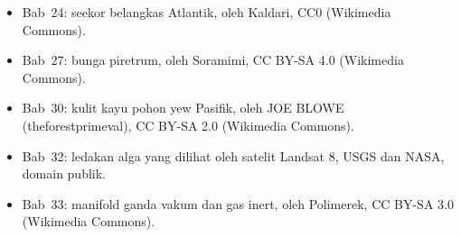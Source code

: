 \begin{itemize}
        Lycurgus, oleh Marie-Lan Nguyen, CC BY 2.5 (Wikimedia Commons).
  \item Bab~24: seekor belangkas Atlantik, oleh Kaldari, CC0 (Wikimedia
        Commons).
  \item Bab~27: bunga piretrum, oleh Soramimi, CC BY-SA 4.0 (Wikimedia
        Commons).
  \item Bab~30: kulit kayu pohon yew Pasifik, oleh JOE BLOWE (theforestprimeval),
        CC BY-SA 2.0 (Wikimedia Commons).
  \item Bab~32: ledakan alga yang dilihat oleh satelit Landsat 8, USGS dan NASA,
        domain publik.
  \item Bab~33: manifold ganda vakum dan gas inert, oleh Polimerek, CC BY-SA
        3.0 (Wikimedia Commons).
\end{itemize}
\clearpage

